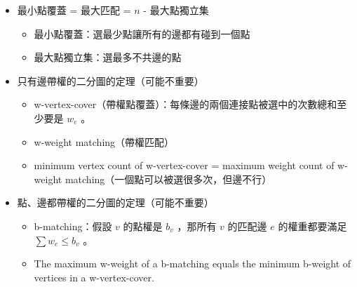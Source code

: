 \begin{itemize}
    \item 最小點覆蓋 = 最大匹配 = $n$ - 最大點獨立集
    \begin{itemize}
        \item 最小點覆蓋：選最少點讓所有的邊都有碰到一個點
        \item 最大點獨立集：選最多不共邊的點
    \end{itemize}
    \item 只有邊帶權的二分圖的定理（可能不重要）
        \begin{itemize}
            \item w-vertex-cover（帶權點覆蓋）：每條邊的兩個連接點被選中的次數總和至少要是 $w_e$ 。
            \item w-weight matching（帶權匹配） 
            \item minimum vertex count of w-vertex-cover = maximum weight count of w-weight matching（一個點可以被選很多次，但邊不行）
        \end{itemize}
    \item 點、邊都帶權的二分圖的定理（可能不重要）
        \begin{itemize}
            \item b-matching：假設 $v$ 的點權是 $b_v$ ，那所有 $v$ 的匹配邊 $e$ 的權重都要滿足 $\sum{w_e}\leq b_v$ 。
            \item The maximum w-weight of a b-matching equals the minimum b-weight of vertices in a w-vertex-cover.
        \end{itemize}
\end{itemize}
